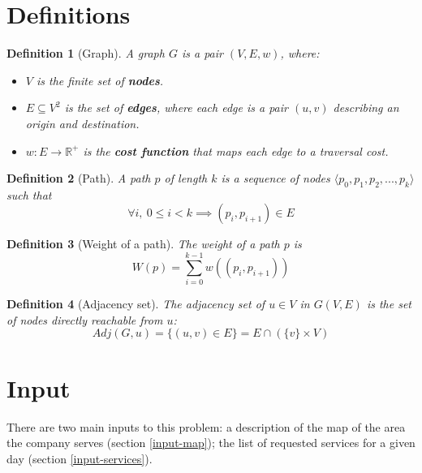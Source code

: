 \documentclass{report}[a4paper]
\newtheorem{definition}{Definition}[section]
\theoremstyle{remark}
\begin{document}
\section{Definitions}
\begin{definition}[Graph]
    A graph $G$ is a pair $(V, E, w)$, where:
    \begin{itemize}
        \item $V$ is the finite set of \textbf{nodes}.
        \item $E \subseteq V^2$ is the set of \textbf{edges}, where each edge is a pair $(u,v)$ describing an origin and destination.
        \item $w: E \rightarrow \mathbb{R}^+$ is the \textbf{cost function} that maps each edge to a traversal cost.
    \end{itemize}
\end{definition}
\begin{definition}[Path]
    A path $p$ of length $k$ is a sequence of nodes $\langle p_0,p_1,p_2,...,p_k\rangle$ such that
    \begin{equation*}
        \forall i,~0 \leq i < k \implies (p_i, p_{i+1}) \in E
    \end{equation*}
\end{definition}
\begin{definition}[Weight of a path]
    The weight of a path $p$ is
    \begin{equation*}
        W(p) = \sum_{i=0}^{k-1}{w((p_i, p_{i+1}))}
    \end{equation*}
\end{definition}
\begin{definition}[Adjacency set]
    The adjacency set of $u \in V$ in $G(V,E)$ is the set of nodes directly reachable from $u$:
    \begin{equation*}
        Adj(G, u) = \{(u, v) \in E\} = E \cap (\{v\}\times V)
    \end{equation*}
\end{definition}
\section{Input}
There are two main inputs to this problem: a description of the map of the area the company serves (section \ref{input-map}); the list of requested services for a given day (section \ref{input-services}).
\end{document}
